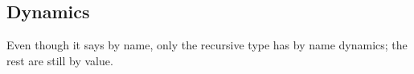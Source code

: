 \subsection{Dynamics}
Even though it says by name, only the recursive type has by name dynamics; the rest
are still by value.

\begin{mathpar}


\end{mathpar}
